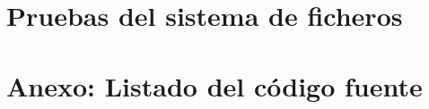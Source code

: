 \documentclass[12pt,a4paper]{article}
\begin{document}
\newpage
\section{Pruebas del sistema de ficheros}


\newpage
\section{Anexo: Listado del código fuente}

\iffalse 
\begin{figure}[h!]
  \centering
  \label{fig:supervisiontree}
  \texttt{[image: supervisiontree]}
  \caption{Árbol de supervisión}
\end{figure}
\fi


\iffalse
\lstdefinestyle{mystyle}{language=Pascal,
  breakatwhitespace=false,
  breaklines=true,
  basicstyle=\footnotesize
}
\begin{mycode}
1> application:start(otpapp).
Iniciado supervisor s1
Iniciado supervisor s2
Iniciado worker w2A 
Iniciado worker w2B 
Iniciado supervisor s3
Iniciado worker w3A 
Iniciado supervisor s5
Iniciado worker w5A 
Iniciado worker w5B 
Iniciado worker w5C 
Iniciado supervisor s4
Iniciado worker w4A 
Iniciado worker w4B 
ok
\end{mycode}
\fi
\end{document}
